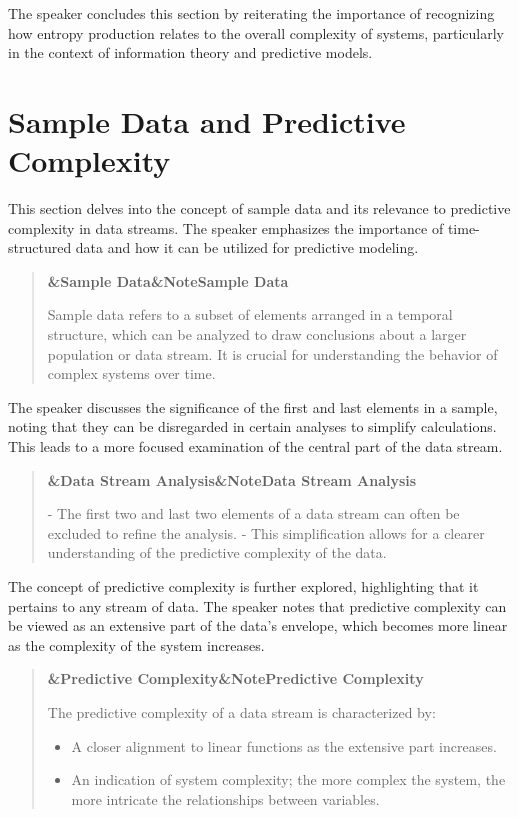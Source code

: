 \documentclass[a4paper]{article}
\newcommand{\boxheading}[1]{%
  \par\smallskip
  \noindent\textbf{\ifx&#1&Note\else#1\fi}\par
  \smallskip
}
\newenvironment{thmbox}[1][]{%
  \begin{quote}\color{blue!60!black}\boxheading{#1}\normalcolor
}{\end{quote}}
\newenvironment{defbox}[1][]{%
  \begin{quote}\color{green!40!black}\boxheading{#1}\normalcolor
}{\end{quote}}
\newenvironment{rembox}[1][]{%
  \begin{quote}\color{black!70}\boxheading{#1}\normalcolor
}{\end{quote}}
\begin{document}
The speaker concludes this section by reiterating the importance of recognizing how entropy production relates to the overall complexity of systems, particularly in the context of information theory and predictive models.

\section{Sample Data and Predictive Complexity}
This section delves into the concept of sample data and its relevance to predictive complexity in data streams. The speaker emphasizes the importance of time-structured data and how it can be utilized for predictive modeling.

\begin{defbox}[Sample Data]
Sample data refers to a subset of elements arranged in a temporal structure, which can be analyzed to draw conclusions about a larger population or data stream. It is crucial for understanding the behavior of complex systems over time.
\end{defbox}

The speaker discusses the significance of the first and last elements in a sample, noting that they can be disregarded in certain analyses to simplify calculations. This leads to a more focused examination of the central part of the data stream.

\begin{rembox}[Data Stream Analysis]
- The first two and last two elements of a data stream can often be excluded to refine the analysis.
- This simplification allows for a clearer understanding of the predictive complexity of the data.
\end{rembox}

The concept of predictive complexity is further explored, highlighting that it pertains to any stream of data. The speaker notes that predictive complexity can be viewed as an extensive part of the data's envelope, which becomes more linear as the complexity of the system increases.

\begin{thmbox}[Predictive Complexity]
The predictive complexity of a data stream is characterized by:
\begin{itemize}
    \item A closer alignment to linear functions as the extensive part increases.
    \item An indication of system complexity; the more complex the system, the more intricate the relationships between variables.
\end{itemize}
\end{thmbox}
\end{document}
